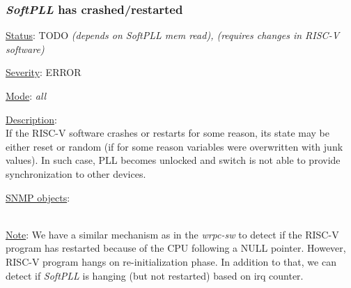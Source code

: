 \subsubsection{\bf \emph{SoftPLL} has crashed/restarted}
		\label{fail:timing:spll_crash}
		\begin{pck_descr}
			\item [] \underline{Status}: TODO \emph{(depends on SoftPLL mem read), (requires changes in RISC-V software)}
			\item [] \underline{Severity}: ERROR
			\item [] \underline{Mode}: \emph{all}
			\item [] \underline{Description}:\\
				If the RISC-V software crashes or restarts for some reason, its state may
				be either reset or random (if for some reason variables were overwritten
				with junk values). In such case, PLL becomes unlocked and switch is not
				able to provide synchronization to other devices.
			\item [] \underline{SNMP objects}:\\
				{\footnotesize
				\\
				 }
			\item [] \underline{Note}: We have a similar mechanism as in the
				\emph{wrpc-sw} to detect if the RISC-V program has restarted because of
				the CPU following a NULL pointer. However, RISC-V program hangs on
				re-initialization phase. 
				In addition to that, we can detect if
				\emph{SoftPLL} is hanging (but not restarted) based on irq counter.
		\end{pck_descr}

